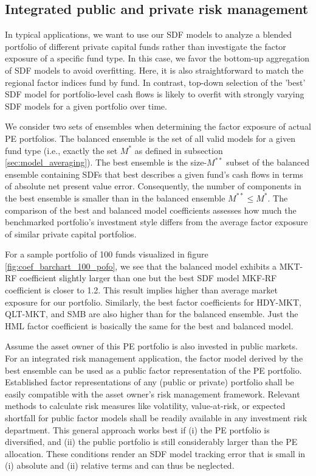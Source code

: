 \documentclass[12pt]{article}
\begin{document}
\subsection{Integrated public and private risk management}
\label{sec:integrated_risk}

In typical applications, we want to use our SDF models to analyze a blended portfolio of different private capital funds rather than investigate the factor exposure of a specific fund type.
In this case, we favor the bottom-up aggregation of SDF models to avoid overfitting.
Here, it is also straightforward to match the regional factor indices fund by fund.
In contrast, top-down selection of the 'best' SDF model for portfolio-level cash flows is likely to overfit with strongly varying SDF models for a given portfolio over time.

We consider two sets of ensembles when determining the factor exposure of actual PE portfolios.
The balanced ensemble is the set of all valid models for a given fund type (i.e., exactly the set $M^*$ as defined in subsection \ref{sec:model_averaging}).
The best ensemble is the size-$M^{**}$ subset of the balanced ensemble containing SDFs that best describes a given fund's cash flows in terms of absolute net present value error. 
Consequently, the number of components in the best ensemble is smaller than in the balanced ensemble $M^{**} \leq M^*$.
The comparison of the best and balanced model coefficients assesses how much the benchmarked portfolio's investment style differs from the average factor exposure of similar private capital portfolios.

For a sample portfolio of 100 funds visualized in figure \ref{fig:coef_barchart_100_pofo}, we see that the balanced model exhibits a MKT-RF coefficient slightly larger than one but the best SDF model MKF-RF coefficient is closer to 1.2.
This result implies higher than average market exposure for our portfolio.
Similarly, the best factor coefficients for HDY-MKT, QLT-MKT, and SMB are also higher than for the balanced ensemble.
Just the HML factor coefficient is basically the same for the best and balanced model.

Assume the asset owner of this PE portfolio is also invested in public markets.
For an integrated risk management application, the factor model derived by the best ensemble can be used as a public factor representation of the PE portfolio.
Established factor representations of any (public or private) portfolio shall be easily compatible with the asset owner's risk management framework.
Relevant methods to calculate risk measures like volatility, value-at-risk, or expected shortfall for public factor models shall be readily available in any investment risk department. 
This general approach works best if (i) the PE portfolio is diversified, and (ii) the public portfolio is still considerably larger than the PE allocation.
These conditions render an SDF model tracking error that is small in (i) absolute and (ii) relative terms and can thus be neglected.
\end{document}
